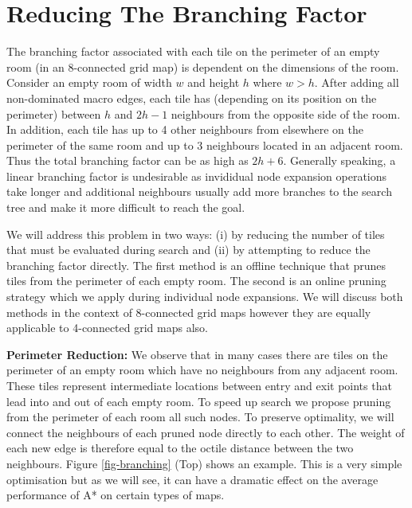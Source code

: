 \section{Reducing The Branching Factor}
The branching factor associated with each tile on the perimeter of an empty room (in an 8-connected 
grid map) is dependent on the dimensions of the room.
Consider an empty room of width $w$ and height $h$ where $w > h$.
After adding all non-dominated macro edges, each tile has (depending on its position on the perimeter) 
between $h$ and $2h - 1$ neighbours from the opposite side 
of the room. 
In addition, each tile has up to 4 other neighbours from elsewhere on the perimeter of the same room and
up to 3 neighbours located in an adjacent room.
Thus the total branching factor can be as high as $2h + 6$.
Generally speaking, a linear branching factor is undesirable as invididual node expansion operations 
take longer and additional neighbours usually add more branches to the search tree and make it more 
difficult to reach the goal.
\par
We will address this problem in two ways: (i) by reducing the number of tiles that must be evaluated during search and 
(ii) by attempting to reduce the branching factor directly.
The first method is an offline technique that prunes tiles from the perimeter of each empty room. 
The second is an online pruning strategy which we apply during individual node expansions.
We will discuss both methods in the context of 8-connected grid maps however
they are equally applicable to 4-connected grid maps also.
\par \noindent \newline
\textbf{Perimeter Reduction:}
We observe that in many cases there are tiles on the perimeter of an empty room which have no neighbours from any 
adjacent room. 
These tiles represent intermediate locations between entry and exit points that lead into and out of each empty room.
To speed up search we propose pruning from the perimeter of each room all such nodes.
To preserve optimality, we will connect the neighbours of each pruned node directly to each other.
The weight of each new edge is therefore equal to the octile distance between the two neighbours.
Figure \ref{fig-branching} (Top) shows an example.
This is a very simple optimisation but as we will see, it can have a dramatic effect on the average performance of
A* on certain types of maps.

